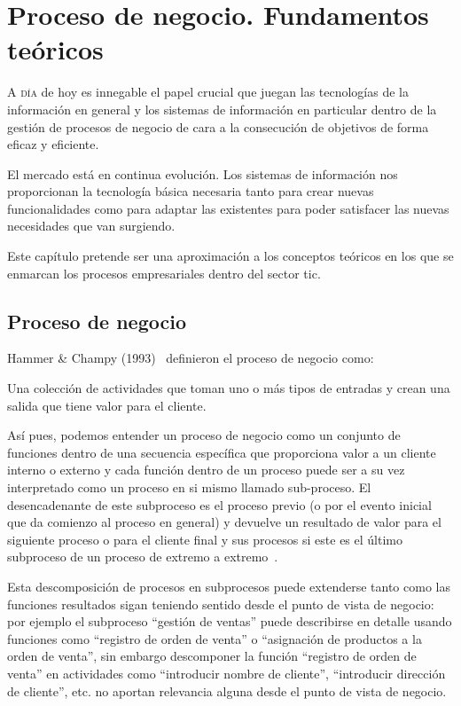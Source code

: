 \chapter{Proceso de negocio. Fundamentos teóricos}
\label{chap:teoria}

\lettrine{A} { día} de hoy es innegable el papel crucial que juegan las tecnologías de la información en general y los sistemas de información en particular dentro de la gestión de procesos de negocio de cara a la consecución de objetivos de forma eficaz y eficiente. 

El mercado está en continua evolución. Los sistemas de información nos proporcionan la tecnología básica necesaria tanto para crear nuevas funcionalidades como para adaptar las existentes para poder satisfacer las nuevas necesidades que van surgiendo. 

Este capítulo pretende ser una aproximación a los conceptos teóricos en los que se enmarcan los procesos empresariales dentro del sector \acrfull{tic}.


\section{Proceso de negocio}

Hammer \& Champy (1993)~\cite{Hammer-Champy} definieron el proceso de negocio como:

\begin{displayquote}
Una colección de actividades que toman uno o más tipos de entradas y crean una salida que tiene valor para el cliente. 
\end{displayquote}

Así pues, podemos entender un proceso de negocio como un conjunto de funciones dentro de una secuencia específica que proporciona valor a un cliente interno o externo y cada función dentro de un proceso puede ser a su vez interpretado como un proceso en si mismo llamado sub-proceso. El desencadenante de este subproceso es el proceso previo (o por el evento inicial que da comienzo al proceso en general) y devuelve un resultado de valor para el siguiente proceso o para el cliente final y sus procesos si este es el último subproceso de un proceso de extremo a extremo~\cite{Kirchmer}. 

Esta descomposición de procesos en subprocesos puede extenderse tanto
como las funciones resultados sigan teniendo sentido desde el punto de
vista de negocio: por ejemplo el subproceso ``gestión de ventas'' puede describirse en detalle usando funciones como ``registro de orden de venta'' o ``asignación de productos a la orden de venta'', sin embargo descomponer la función ``registro de orden de venta'' en actividades como ``introducir nombre de cliente'', ``introducir dirección de cliente'', etc. no aportan relevancia alguna desde el punto de vista de negocio.

